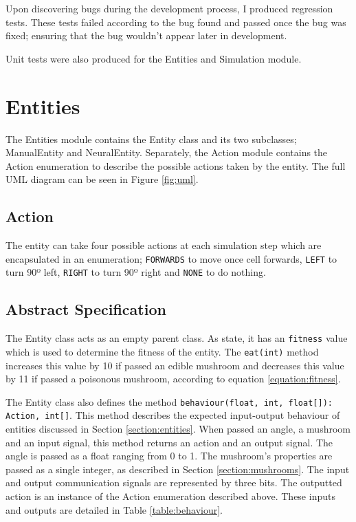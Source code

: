\documentclass[12pt,a4paper,twoside,openright]{report}
\begin{document}
Upon discovering bugs during the development process, I produced regression tests. These tests failed according to the bug found and passed once the bug was fixed; ensuring that the bug wouldn't appear later in development.

Unit tests were also produced for the Entities and Simulation module.

\section{Entities}

The Entities module contains the Entity class and its two subclasses; ManualEntity and NeuralEntity. Separately, the Action module contains the Action enumeration to describe the possible actions taken by the entity. The full UML diagram can be seen in Figure \ref{fig:uml}.

\subsection{Action}

The entity can take four possible actions at each simulation step which are encapsulated in an enumeration; \texttt{FORWARDS} to move once cell forwards, \texttt{LEFT} to turn 90º left, \texttt{RIGHT} to turn 90º right and \texttt{NONE} to do nothing.

\subsection{Abstract Specification}

The Entity class acts as an empty parent class. As state, it has an \texttt{fitness} value which is used to determine the fitness of the entity. The \texttt{eat(int)} method increases this value by 10 if passed an edible mushroom and decreases this value by 11 if passed a poisonous mushroom, according to equation \ref{equation:fitness}. 

The Entity class also defines the method \texttt{behaviour(float, int, float[]): Action, int[]}. This method describes the expected input-output behaviour of entities discussed in Section \ref{section:entities}. When passed an angle, a mushroom and an input signal, this method returns an action and an output signal. The angle is passed as a float ranging from 0 to 1. The mushroom's properties are passed as a single integer, as described in Section \ref{section:mushrooms}. The input and output communication signals are represented by three bits. The outputted action is an instance of the Action enumeration described above. These inputs and outputs are detailed in Table \ref{table:behaviour}. 
\end{document}
